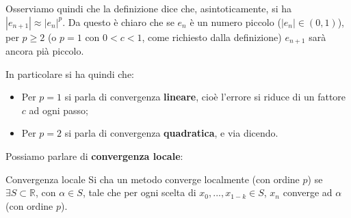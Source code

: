 \documentclass[a4paper,11pt]{article}
\begin{document}
Osserviamo quindi che la definizione dice che, asintoticamente, si ha $|e_{n + 1}| \approx |e_n|^p$.
Da questo è chiaro che se $e_{n}$ è un numero piccolo ($|e_n| \in (0, 1)$), per $p \geq 2$ (o $p = 1$ con $0 < c < 1$, come richiesto dalla definizione) $e_{n + 1}$ sarà ancora pià piccolo.

In particolare si ha quindi che:
\begin{itemize}
	\item Per $p = 1$ si parla di convergenza \textbf{lineare}, cioè l'errore si riduce di un fattore $c$ ad ogni passo;
	\item Per $p = 2$ si parla di convergenza \textbf{quadratica}, e via dicendo.
\end{itemize}

Possiamo parlare di \textbf{convergenza locale}:
\begin{definition}{Convergenza locale}
	Si cha un metodo converge localmente (con ordine $p$) se $\exists S \subset \mathbb{R}$, con $\alpha \in S$, tale che per ogni scelta di $x_0, ..., x_{1 - k} \in S$, $x_n$ converge ad $\alpha$ (con ordine $p$).
\end{definition}
\end{document}
